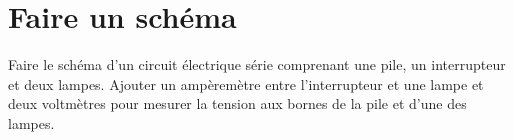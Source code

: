 \newpage


\section{Faire un schéma}
 
 \begin{questions}
 	\question Faire le schéma d'un circuit électrique série comprenant une pile, un interrupteur et deux lampes. Ajouter un ampèremètre entre l'interrupteur et une lampe et deux voltmètres pour mesurer la tension aux bornes de la pile et d'une des lampes.
 	
 	\makeemptybox{10cm}

 \end{questions}